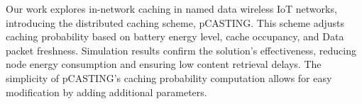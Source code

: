 \documentclass[a0paper,portrait]{baposter}
\begin{document}
\begin{poster}
{		\vspace{0.25em}
		Our work explores in-network caching in named data wireless IoT networks, introducing the distributed caching scheme, pCASTING.
		This scheme adjusts caching probability based on battery energy level, cache occupancy, and Data packet freshness. Simulation results
		confirm the solution's effectiveness, reducing node energy consumption and ensuring low content retrieval delays. The simplicity of pCASTING's
		caching probability computation allows for easy modification by adding additional parameters.
		\vspace{0.25em}
	}







\end{poster}
\end{document}
